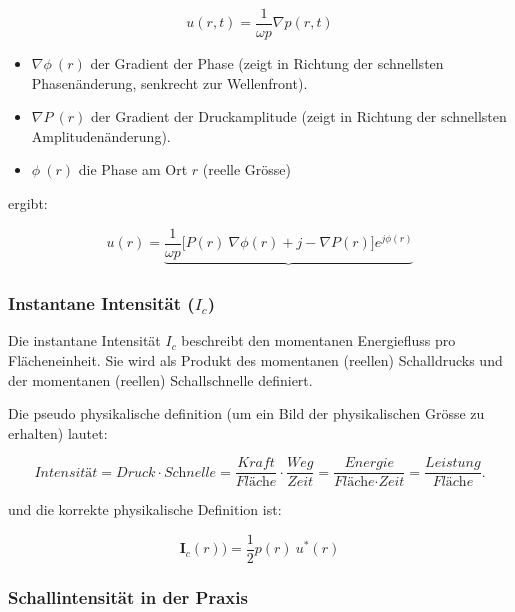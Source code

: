 \begin{equation}
u(r,t) = \frac{1}{\omega p} \nabla p(r,t)
\end{equation}

\begin{itemize}
\item $\nabla \phi \: (r)$ der Gradient der Phase (zeigt in Richtung der schnellsten Phasenänderung, senkrecht zur Wellenfront).
\item $\nabla P \:(r)$ der Gradient der Druckamplitude (zeigt in Richtung der schnellsten Amplitudenänderung).
\item $\phi \: (r)$ die Phase am Ort $r$ (reelle Grösse)
\end{itemize}

ergibt:

\begin{equation}
u(r) = \underbrace{\frac{1}{\omega p} \bigg[ P(r) \: \nabla \phi(r) + j - \nabla P(r) \bigg]e^{j\phi (r)}}_{}
\end{equation}

\subsubsection{Instantane Intensität ($I_c$)}

Die instantane Intensität $I_c$ beschreibt den momentanen Energiefluss pro Flächeneinheit. Sie wird als Produkt des momentanen (reellen) Schalldrucks und der momentanen (reellen) Schallschnelle definiert.

Die pseudo physikalische definition (um ein Bild der physikalischen Grösse zu erhalten) lautet:

\begin{equation}
\textit{Intensität} = \textit{Druck} \cdot \textit{Schnelle}=\frac{\textit{Kraft}}{\textit{Fläche}} \cdot \frac{\textit{Weg}}{\textit{Zeit}} = \frac{\textit{Energie}}{\textit{Fläche}\cdot \textit{Zeit}} = \frac{\textit{Leistung}}{\textit{Fläche}}.
\label{helmholtz:equationIntensitaetPseudoDef}
\end{equation}

und die korrekte physikalische Definition ist:

\begin{equation}
\mathbf{I}_c (r) ) = \frac{1}{2} p(r) \: u^{*}(r)
\label{helmholtz:equationIntensitaetMomentan}
\end{equation}



\subsubsection{Schallintensität in der Praxis}

